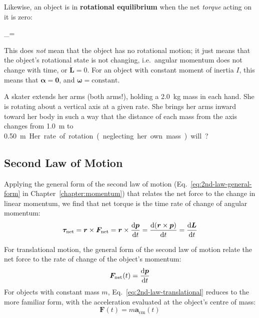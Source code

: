 Likewise, an object is in \textbf{rotational equilibrium} when the net
\emph{torque} acting on it is zero:
\begin{important-equation}
  \bm\tau_=\quad{}
\end{important-equation}
This does \emph{not} mean that the object has no rotational motion; it just
means that the object's rotational state is not changing, i.e.\ angular
momentum does not change with time, or $\dot{\bm L}=0$. For an object with
constant moment of inertia $I$, this means that $\bm\alpha=\bm 0$, and
$\bm\omega=\text{constant}$.

\begin{example}
  A skater extends her arms (both arms!), holding a \SI{2.0}{\kilo\gram} mass
  in each hand. She is rotating about a vertical axis at a given rate. She
  brings her arms inward toward her body in such a way that the distance of
  each mass from the axis changes from \SI{1.0}{\metre} to \SI{.50}\metre. Her
  rate of rotation (neglecting her own mass) will?
\end{example}




\subsection{Second Law of Motion}
Applying the general form of the second law of motion
(Eq.~\ref{eq:2nd-law-general-form} in Chapter~\ref{chapter:momentum}) that
relates the net force to the change in linear momentum, we find that net torque
is the time rate of change of angular momentum:
\begin{equation*}
  \bm\tau_\text{net}=\bm r\times\bm F_\text{net}
  =\bm r\times\diff{\bm p}t
  =\diff{(\bm r\times\bm p)}t
  =\diff{\bm L}t
\end{equation*}


For translational motion, the general form of the second law of motion relate
the net force to the rate of change of the object's momentum:
\begin{equation}
  \bm F_\text{net}(t)=\diff{\bm p}t
  \label{eq:2nd-law-translational}
\end{equation}
For objects with constant mass $m$, Eq.~\ref{eq:2nd-law-translational} reduces
to the more familiar form, with the acceleration evaluated at the object's
centre of mass:
\begin{equation*}
  \bm F(t)=m\bm a_\text{cm}(t)
\end{equation*}

